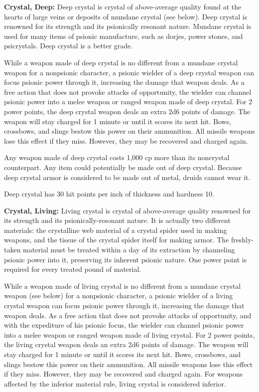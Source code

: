 \textbf{Crystal, Deep:} Deep crystal is crystal of above-average quality found at the hearts of large veins or deposits of mundane crystal (see below). Deep crystal is renowned for its strength and its psionically resonant nature. Mundane crystal is used for many items of psionic manufacture, such as dorjes, power stones, and psicrystals. Deep crystal is a better grade.

While a weapon made of deep crystal is no different from a mundane crystal weapon for a nonpsionic character, a psionic wielder of a deep crystal weapon can focus psionic power through it, increasing the damage that weapon deals. As a free action that does not provoke attacks of opportunity, the wielder can channel psionic power into a melee weapon or ranged weapon made of deep crystal. For 2 power points, the deep crystal weapon deals an extra 2d6 points of damage. The weapon will stay charged for 1 minute or until it scores its next hit. Bows, crossbows, and slings bestow this power on their ammunition. All missile weapons lose this effect if they miss. However, they may be recovered and charged again.

Any weapon made of deep crystal costs 1,000 cp more than its noncrystal counterpart. Any item could potentially be made out of deep crystal. Because deep crystal armor is considered to be made out of metal, druids cannot wear it.

Deep crystal has 30 hit points per inch of thickness and hardness 10.

\textbf{Crystal, Living:} Living crystal is crystal of above-average quality renowned for its strength and its psionically-resonant nature. It is actually two different materials: the crystalline web material of a crystal spider used in making weapons, and the tissue of the crystal spider itself for making armor. The freshly-taken material must be treated within a day of its extraction by channeling psionic power into it, preserving its inherent psionic nature. One power point is required for every treated pound of material.

While a weapon made of living crystal is no different from a mundane crystal weapon (see below) for a nonpsionic character, a psionic wielder of a living crystal weapon can focus psionic power through it, increasing the damage that weapon deals. As a free action that does not provoke attacks of opportunity, and with the expediture of his psionic focus, the wielder can channel psionic power into a melee weapon or ranged weapon made of living crystal. For 2 power points, the living crystal weapon deals an extra 2d6 points of damage. The weapon will stay charged for 1 minute or until it scores its next hit. Bows, crossbows, and slings bestow this power on their ammunition. All missile weapons lose this effect if they miss. However, they may be recovered and charged again. For weapons affected by the inferior material rule, living crystal is considered inferior.


